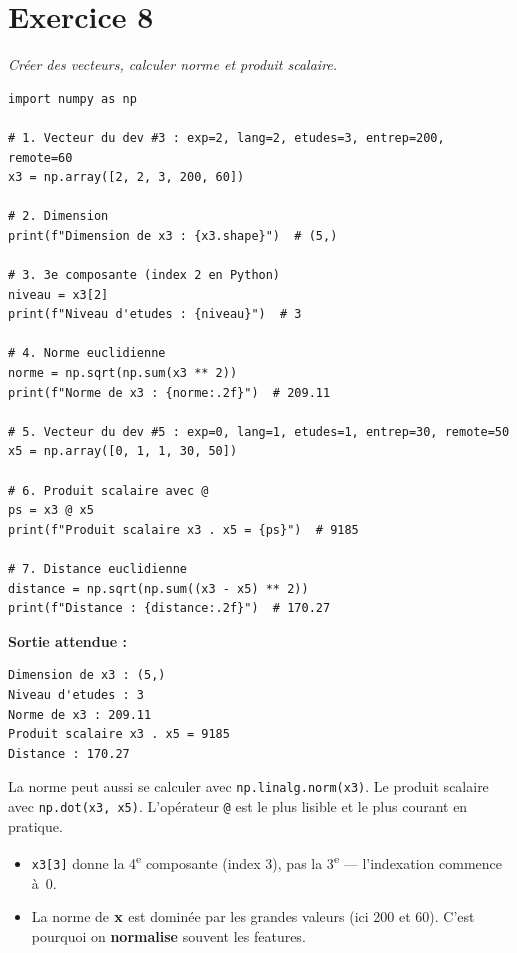 \section*{Exercice 8 \hfill \exointermediaire}
\textit{Cr\'{e}er des vecteurs, calculer norme et produit scalaire.}

\separateur

\begin{pythonbox}
\begin{lstlisting}
import numpy as np

# 1. Vecteur du dev #3 : exp=2, lang=2, etudes=3, entrep=200, remote=60
x3 = np.array([2, 2, 3, 200, 60])

# 2. Dimension
print(f"Dimension de x3 : {x3.shape}")  # (5,)

# 3. 3e composante (index 2 en Python)
niveau = x3[2]
print(f"Niveau d'etudes : {niveau}")  # 3

# 4. Norme euclidienne
norme = np.sqrt(np.sum(x3 ** 2))
print(f"Norme de x3 : {norme:.2f}")  # 209.11

# 5. Vecteur du dev #5 : exp=0, lang=1, etudes=1, entrep=30, remote=50
x5 = np.array([0, 1, 1, 30, 50])

# 6. Produit scalaire avec @
ps = x3 @ x5
print(f"Produit scalaire x3 . x5 = {ps}")  # 9185

# 7. Distance euclidienne
distance = np.sqrt(np.sum((x3 - x5) ** 2))
print(f"Distance : {distance:.2f}")  # 170.27
\end{lstlisting}
\end{pythonbox}

\textbf{Sortie attendue :}
\begin{verbatim}
Dimension de x3 : (5,)
Niveau d'etudes : 3
Norme de x3 : 209.11
Produit scalaire x3 . x5 = 9185
Distance : 170.27
\end{verbatim}

\begin{intuitionbox}[Variante]
    La norme peut aussi se calculer avec \texttt{np.linalg.norm(x3)}.
    Le produit scalaire avec \texttt{np.dot(x3, x5)}.
    L'op\'{e}rateur \texttt{@} est le plus lisible et le plus courant en pratique.
\end{intuitionbox}

\begin{attentionbox}
    \begin{itemize}
        \item \texttt{x3[3]} donne la 4\textsuperscript{e} composante (index 3), pas la 3\textsuperscript{e} --- l'indexation commence \`{a}~0.
        \item La norme de $\mathbf{x}$ est domin\'{e}e par les grandes valeurs (ici 200 et 60). C'est pourquoi on \textbf{normalise} souvent les features.
    \end{itemize}
\end{attentionbox}

